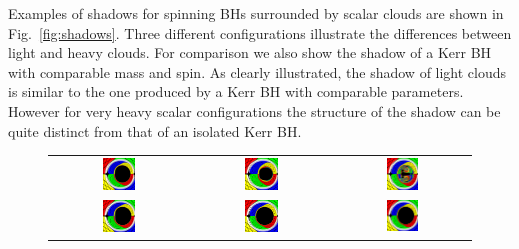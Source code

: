 \documentclass[11pt]{article}
\numberwithin{equation}{section} %
\begin{document}
Examples of shadows for spinning BHs surrounded by scalar clouds are shown in Fig.~\ref{fig:shadows}. Three different configurations illustrate the differences between light and heavy clouds. For comparison we also show the shadow of a Kerr BH with comparable mass and spin. As clearly illustrated, the shadow of light clouds is similar to the one produced by a Kerr BH with comparable parameters. However for very heavy scalar configurations the structure of the shadow can be quite distinct from that of an isolated Kerr BH. 
%
\begin{figure}[thb]
\begin{center}
\begin{tabular}{ccc}
\includegraphics[width=0.25\textwidth]{I.png} & \includegraphics[width=0.25\textwidth]{II.png}& \includegraphics[width=0.25\textwidth]{III.jpg}
\\
\includegraphics[width=0.25\textwidth]{Kerr-999_I.jpg} & \includegraphics[width=0.25\textwidth]{Kerr-85_II.jpg}& \includegraphics[width=0.25\textwidth]{Kerr-894_III.jpg}

\end{tabular}
\end{center}
\end{figure}
\end{document}
